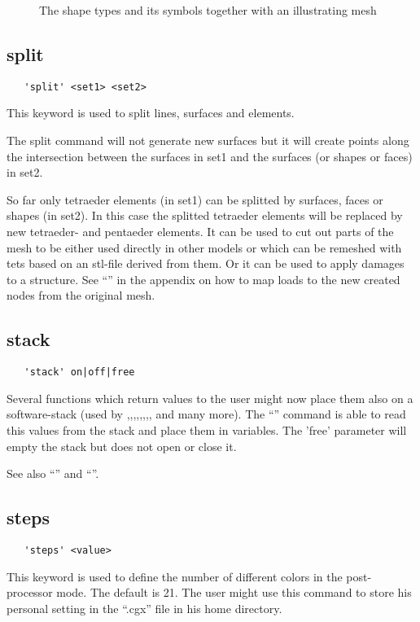 \documentclass{article}
\begin{document}
\begin{figure}[h]
\caption{\label{The shape types and its symbols together with an illustrating mesh}The shape types and its symbols together with an illustrating mesh}
\end{figure}

\subsection{\label{split}split}
\begin{verbatim}
   'split' <set1> <set2> 
\end{verbatim}
This keyword is used to split lines, surfaces and elements.

The split command will not generate new surfaces but it will create points along the intersection between the surfaces in set1 and the surfaces (or shapes or faces) in set2.

So far only tetraeder elements (in set1) can be splitted by surfaces, faces or shapes (in set2). In this case the splitted tetraeder elements will be replaced by new tetraeder- and pentaeder elements. It can be used to cut out parts of the mesh to be either used directly in other models or which can be remeshed with tets based on an stl-file derived from them. Or it can be used to apply damages to a structure. See ``'' in the appendix on how to map loads to the new created nodes from the original mesh.

\subsection{\label{stack}stack}
\begin{verbatim}
   'stack' on|off|free
\end{verbatim}
Several functions which return values to the user might now place them also on a software-stack (used by ,,,,,,,, and many more). The ``'' command is able to read this values from the stack and place them in variables. The 'free' parameter will empty the stack but does not open or close it.

See also ``'' and ``''.

\subsection{\label{steps}steps}
\begin{verbatim}
   'steps' <value> 
\end{verbatim}
This keyword is used to define the number of different colors in the post-processor mode. The default is 21. The user might use this command to store his personal setting in the ``.cgx'' file in his home directory.
\end{document}

